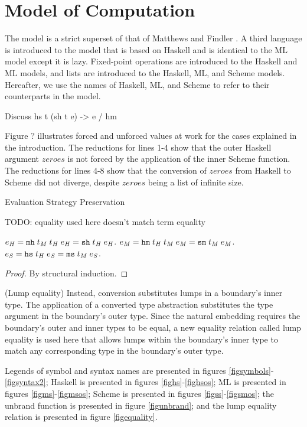 \section{Model of Computation}

The model is a strict superset of that of Matthews and Findler \cite{matthews07}. A third language is introduced to the model that is based on Haskell and is identical to the ML model except it is lazy. Fixed-point operations are introduced to the Haskell and ML models, and lists are introduced to the Haskell, ML, and Scheme models. Hereafter, we use the names of Haskell, ML, and Scheme to refer to their counterparts in the model.

Discuss hs t (sh t e) -> e / hm

Figure ? illustrates forced and unforced values at work for the cases explained in the introduction. The reductions for lines 1-4 show that the outer Haskell argument $zeroes$ is not forced by the application of the inner Scheme function. The reductions for lines 4-8 show that the conversion of $zeroes$ from Haskell to Scheme did not diverge, despite $zeroes$ being a list of infinite size.

\begin{theorem}{Evaluation Strategy Preservation}

TODO: equality used here doesn't match term equality

\label{thmstr}
$e_{\mathit{H}} = \mathtt{mh} \; t_{\mathit{M}} \; t_{\mathit{H}} \; e_{\mathit{H}} = \mathtt{sh} \; t_{\mathit{H}} \; e_{\mathit{H}}$.
$e_{\mathit{M}} = \mathtt{hm} \; t_{\mathit{H}} \; t_{\mathit{M}} \; e_{\mathit{M}} = \mathtt{sm} \; t_{\mathit{M}} \; e_{\mathit{M}}$.
$e_{\mathit{S}} = \mathtt{hs} \; t_{\mathit{H}} \; e_{\mathit{S}} = \mathtt{ms} \; t_{\mathit{M}} \; e_{\mathit{S}}$.
\begin{proof}
By structural induction.
\end{proof}
\end{theorem}

(Lump equality) Instead, conversion substitutes lumps in a boundary's inner type. The application of a converted type abstraction substitutes the type argument in the boundary's outer type. Since the natural embedding \cite{matthews07} requires the boundary's outer and inner types to be equal, a new equality relation called lump equality is used here that allows lumps within the boundary's inner type to match any corresponding type in the boundary's outer type.

Legends of symbol and syntax names are presented in figures \ref{figsymbols}-\ref{figsyntax2}; Haskell is presented in figures \ref{fighs}-\ref{fighsos}; ML is presented in figures \ref{figms}-\ref{figmsos}; Scheme is presented in figures \ref{figss}-\ref{figsmos}; the unbrand function is presented in figure \ref{figunbrand}; and the lump equality relation is presented in figure \ref{figequality}.

